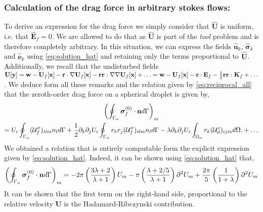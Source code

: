\subsubsection{Calculation of the drag force in arbitrary stokes flows:}
To derive an expression for the drag force we simply consider that $\hat{\textbf{U}}$ is uniform, i.e. that $\hat{\textbf{E}}_f = 0$. 
We are allowed to do that as $\hat{\textbf{U}}$ is part of the \textit{tool} problem and is therefore completely arbitrary. 
In this situation, we can express the fields $\hat{\textbf{u}}_k$, $\hat{\bm\sigma}_k$ and $\hat{\textbf{e}}_k$ using \ref{eq:solution_hat} and retaining only the terms proportional to $\hat{\textbf{U}}$. 
Additionally, we recall that the undisturbed fields $\textbf{U}[\textbf{y}] = \textbf{w} - \textbf{U}_f[\textbf{x}] - \textbf{r}\cdot \mathbf{\nabla} \textbf{U}_f[\textbf{x}] - \textbf{rr}:\mathbf{\nabla}\mathbf{\nabla} \textbf{U}_f[\textbf{x}] + \ldots =  \textbf{w} - \textbf{U}_f[\textbf{x}] - \textbf{r}\cdot \textbf{E}_f - \frac{1}{2}\textbf{rr}: \textbf{K}_f + \ldots$.
We deduce form all these remarks and the relation  given by \ref{eq:reciprocal_all} that the zeroth-order drag force on a spherical droplet is given by, 
\begin{multline*}
    \left(
        \intS{\bm\sigma_f^{(0)} \cdot \textbf{n}}
    \right)_m\\
    = 
    U_i  \intS{  (\mathcal{U}_f^\sigma)_{ilm}  n_l }
    + \frac{1}{2}\partial_k\partial_j U_i \intS{ r_kr_j (\mathcal{U}_f^\sigma)_{ilm}  n_l }
    -\lambda \partial_k\partial_j U_i  \intO{ r_k (\mathcal{U}_d^e)_{ijm} }. 
    + \ldots
    \label{eq:reciprocal_drag}
\end{multline*}
We obtained a relation that is entirely computable form the explicit expression given by \ref{eq:solution_hat}. 
Indeed, it can be shown using \ref{eq:solution_hat} that, 
\begin{align*}
    \left(
        \oint_{\Gamma_{\alpha}} \bm\sigma_f^{(0)} \cdot \textbf{n} d\Gamma
    \right)_m
    = 
    - 2\pi\left(\frac{3\lambda +2 }{\lambda +1}\right)
    U_m  
    - \pi \left(\frac{\lambda +2/5 }{\lambda +1}\right)\partial^2 U_m 
    + \frac{2 \pi}{5} \left(\frac{1}{1+\lambda}\right) 
     \partial^2 U_m 
\end{align*}
It can be shown that the first term on the right-hand side, proportional to the relative velocity $\textbf{U}$ is the Hadamard-Ribczynski contribution. 
